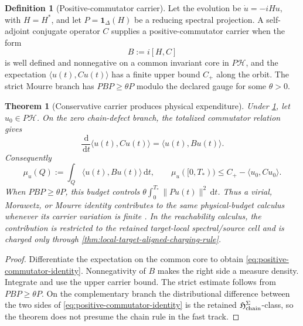 \documentclass[11pt]{article}
\numberwithin{section}{part}
\theoremstyle{plain}
\newtheorem{theorem}{Theorem}[section]
\theoremstyle{definition}
\newtheorem{definition}[definition]{Definition}
\theoremstyle{remark}
\newcommand{\dd}{\,\mathrm d}
\newcommand{\Hspace}{\mathcal H}
\begin{document}
\begin{definition}[Positive-commutator carrier]
\label{def:positive-commutator-carrier}
Let the evolution be \(\dot u=-iHu\), with \(H=H^*\), and let
\(P=\mathbf 1_\Delta(H)\) be a reducing spectral projection.  A self-adjoint
conjugate operator \(C\) supplies a positive-commutator carrier when the form
\[
 B:=i[H,C]
\]
is well defined and nonnegative on a common invariant core in \(P\Hspace\),
and the expectation \(\langle u(t),Cu(t)\rangle\) has a finite upper bound
\(C_+\) along the orbit.  The strict Mourre branch has
\(PBP\ge\theta P\) modulo the declared gauge for some \(\theta>0\).
\end{definition}

\begin{theorem}[Conservative carrier produces physical expenditure]
\label{thm:positive-commutator-budget}
Under \cref{def:positive-commutator-carrier}, let \(u_0\in P\Hspace\).  On
the zero chain-defect branch, the totalized commutator relation gives
\begin{equation}
 \label{eq:positive-commutator-identity}
 \frac{\dd}{\dd t}\langle u(t),Cu(t)\rangle
 =\langle u(t),Bu(t)\rangle.
\end{equation}
Consequently
\begin{equation}
 \label{eq:positive-commutator-physical-budget}
 \mu_u(Q):=\int_Q\langle u(t),Bu(t)\rangle\dd t,
 \qquad
 \mu_u([0,T_*))
 \le C_+-\langle u_0,Cu_0\rangle.
\end{equation}
When \(PBP\ge\theta P\), this budget controls
\(\theta\int_0^{T_*}\|Pu(t)\|^2\dd t\).  Thus a virial, Morawetz, or Mourre
identity contributes to the same physical-budget calculus whenever its
carrier variation is finite \citep{JensenMourrePerry1984}.  In the
reachability calculus, the contribution is restricted to the retained
target-local spectral/source cell and is charged only through
\cref{thm:local-target-aligned-charging-rule}.
\end{theorem}

\begin{proof}
Differentiate the expectation on the common core to obtain
\eqref{eq:positive-commutator-identity}.  Nonnegativity of \(B\) makes the
right side a measure density.  Integrate and use the upper carrier bound.
The strict estimate follows from \(PBP\ge\theta P\).
On the complementary branch the distributional difference between the two
sides of \eqref{eq:positive-commutator-identity} is the retained
\(\mathfrak H_{\rm chain}^{\Sigma}\)-class, so the theorem does not presume
the chain rule in the fast track.
\end{proof}
\end{document}
